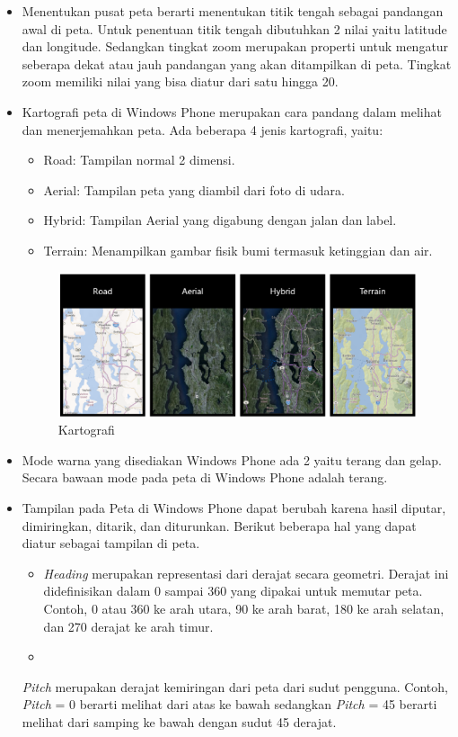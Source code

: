 \begin{itemize}
	\item Menentukan pusat peta berarti menentukan titik tengah sebagai pandangan awal di peta. Untuk penentuan titik tengah dibutuhkan 2 nilai yaitu latitude dan longitude. Sedangkan tingkat zoom merupakan properti untuk mengatur seberapa dekat atau jauh pandangan yang akan ditampilkan di peta. Tingkat zoom memiliki nilai yang bisa diatur dari satu hingga 20. 
	\item Kartografi peta di Windows Phone merupakan cara pandang dalam melihat dan menerjemahkan peta. Ada beberapa 4 jenis kartografi, yaitu:
		
		\begin{itemize}
			\item Road: Tampilan normal 2 dimensi.
			\item Aerial: Tampilan peta yang diambil dari foto di udara.
			\item Hybrid: Tampilan Aerial yang digabung dengan jalan dan label.
			\item Terrain: Menampilkan gambar fisik bumi termasuk ketinggian dan air.
		\end{itemize}
		
		\begin{figure}[h]
			\centering
				\includegraphics[scale=0.4]{Gambar/kartografi}
			\caption{Kartografi}
			\label{fig:Kartografi}
		\end{figure}
		
	\item	Mode warna yang disediakan Windows Phone ada 2 yaitu terang dan gelap. Secara bawaan mode pada peta di Windows Phone adalah terang.
	
	\item Tampilan pada Peta di Windows Phone dapat berubah karena hasil diputar, dimiringkan, ditarik, dan diturunkan. Berikut beberapa hal yang dapat diatur sebagai tampilan di peta.
	
		\begin{itemize}
			\item \textit{Heading} merupakan representasi dari derajat secara geometri. Derajat ini didefinisikan dalam 0 sampai 360 yang dipakai untuk memutar peta. Contoh, 0 atau 360 ke arah utara, 90 ke arah barat, 180 ke arah selatan, dan 270 derajat ke arah timur.
			\item 
		\end{itemize} \textit{Pitch} merupakan derajat kemiringan dari peta dari sudut pengguna. Contoh, \textit{Pitch} = 0 berarti melihat dari atas ke bawah sedangkan \textit{Pitch} = 45 berarti melihat dari samping ke bawah dengan sudut 45 derajat.
\end{itemize}

